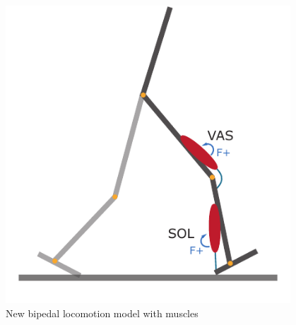 \documentclass[10pt]{beamer}
\begin{document}
\begin{frame}
\begin{figure}
\begin{overprint}
				\begin{columns}
					\begin{column}{.55\textwidth}
						\centering
						\includegraphics[height=.5\textheight]{images/new_model/stance/muscle_vas_sol.pdf}
						\caption{New bipedal locomotion model with muscles}
					\end{column}
					\begin{column}{.5\textwidth}
						\centering
						 \\
					\end{column}  
				\end{columns}
				

\end{overprint}
\end{figure}
\end{frame}
\end{document}
